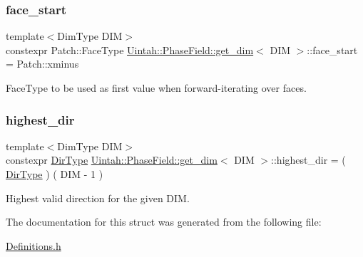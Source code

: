 \subsubsection{\texorpdfstring{face\+\_\+start}{face\_start}}
{\footnotesize\ttfamily template$<$Dim\+Type D\+IM$>$ \\
constexpr Patch\+::\+Face\+Type \hyperlink{structUintah_1_1PhaseField_1_1get__dim}{Uintah\+::\+Phase\+Field\+::get\+\_\+dim}$<$ D\+IM $>$\+::face\+\_\+start = Patch\+::xminus\hspace{0.3cm}{\ttfamily [static]}}



Face\+Type to be used as first value when forward-\/iterating over faces. 

\mbox{\label{structUintah_1_1PhaseField_1_1get__dim_a5cccf47293a967c562447e0aa5fdbb43}} 
\subsubsection{\texorpdfstring{highest\+\_\+dir}{highest\_dir}}
{\footnotesize\ttfamily template$<$Dim\+Type D\+IM$>$ \\
constexpr \hyperlink{namespaceUintah_1_1PhaseField_a94555da848596a419ae2c0e32649e1dc}{Dir\+Type} \hyperlink{structUintah_1_1PhaseField_1_1get__dim}{Uintah\+::\+Phase\+Field\+::get\+\_\+dim}$<$ D\+IM $>$\+::highest\+\_\+dir = ( \hyperlink{namespaceUintah_1_1PhaseField_a94555da848596a419ae2c0e32649e1dc}{Dir\+Type} ) ( D\+IM -\/ 1 )\hspace{0.3cm}{\ttfamily [static]}}



Highest valid direction for the given D\+IM. 



The documentation for this struct was generated from the following file\+:\begin{DoxyCompactItemize}
\item 
\hyperlink{Definitions_8h}{Definitions.\+h}\end{DoxyCompactItemize}
